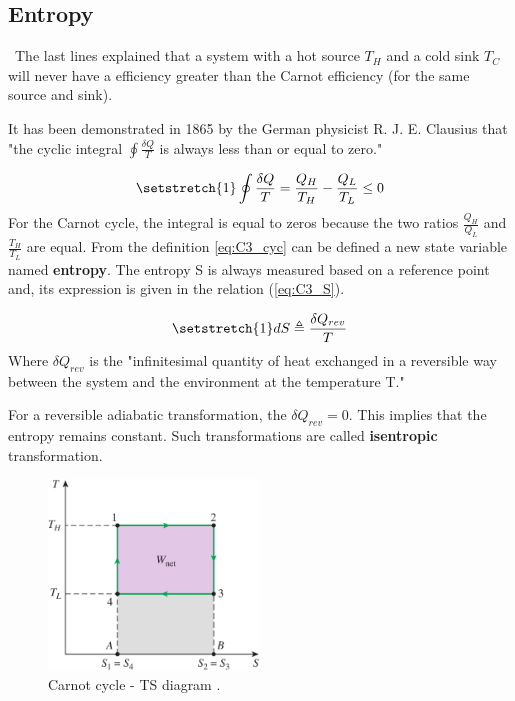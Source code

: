 \subsection{Entropy}
\quad\ The last lines explained that a system with a hot source $T_H$ and a cold sink $T_C$ will never have a efficiency greater than the Carnot efficiency (for the same source and sink).

It has been demonstrated in 1865 by the German physicist R. J. E. Clausius that "the cyclic integral $\oint\frac{\delta Q}{T}$ is always less than or equal to zero."\cite{2015}

\begin{equation}
\setstretch{1}
\oint\frac{\delta Q}{T} = \frac{Q_H}{T_H} - \frac{Q_L}{T_L}\leq 0\label{eq:C3_cyc}
\end{equation}
For the Carnot cycle, the integral is equal to zeros because the two ratios $\frac{Q_H}{Q_L}$ and $\frac{T_H}{T_L}$ are equal.
From the definition \ref{eq:C3_cyc} can be defined a new state variable named \textbf{entropy}. The entropy S is always measured based on a reference point and, its expression is given in the relation (\ref{eq:C3_S}).

\begin{equation}
\setstretch{1}
dS \triangleq \frac{\delta Q_{rev}}{T}\label{eq:C3_S}
\end{equation}
Where $\delta Q_{rev}$ is the "infinitesimal quantity of heat exchanged in a reversible way between the system and the environment at the temperature T."\cite{Dewallef2019} 

For a reversible adiabatic transformation, the $\delta Q_{rev}=0$. This implies that the entropy remains constant. Such transformations are called \textbf{isentropic} transformation.
\begin{figure}[h]
\centering
\includegraphics[width=0.5\textwidth]{Carnot_TS.png}
\caption{Carnot cycle - TS diagram \cite{2015}.}
\label{fig:C3_CarnotTS}
\end{figure}
